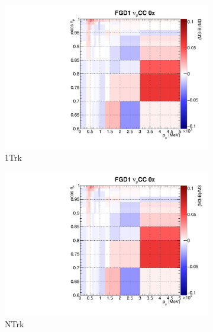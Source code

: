 \begin{figure}
	\begin{subfigure}[t]{0.24\textwidth}
		\includegraphics[width=\textwidth, trim={0mm 0mm 10mm 7mm}, clip, page=27]{figures/mach3/banff/postfit_comp}
		\caption{1Trk}
	\end{subfigure}
	\begin{subfigure}[t]{0.24\textwidth}
		\includegraphics[width=\textwidth, trim={0mm 0mm 10mm 7mm}, clip, page=30]{figures/mach3/banff/postfit_comp}
		\caption{NTrk}
	\end{subfigure}
	\begin{subfigure}[t]{0.24\textwidth}

\end{subfigure}
\end{figure}
